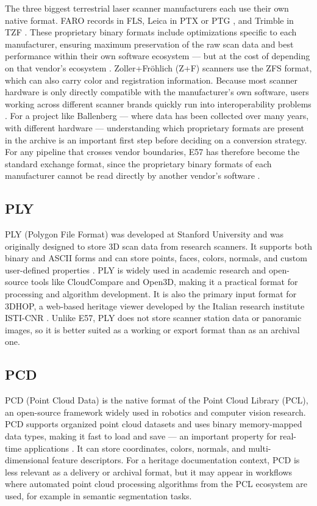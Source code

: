 \documentclass[]{report}
\begin{document}
The three biggest terrestrial laser scanner manufacturers each use their own native format.
FARO records in FLS, Leica in PTX or PTG \cite{leica_supported_formats}, and Trimble in TZF \cite{cadinterop_formats}. These
proprietary binary formats include optimizations specific to each manufacturer, ensuring maximum
preservation of the raw scan data and best performance within their own software ecosystem ---
but at the cost of depending on that vendor's ecosystem \cite{cadinterop_formats}. Zoller+Fröhlich
(Z+F) scanners use the ZFS format, which can also carry color and registration information.
Because most scanner hardware is only directly compatible with the manufacturer's own software,
users working across different scanner brands quickly run into interoperability problems
\cite{vercator2021formats}. For a project like Ballenberg --- where data has been collected over
many years, with different hardware --- understanding which proprietary formats are
present in the archive is an important first step before deciding on a conversion strategy.
For any pipeline that crosses vendor boundaries, E57 has therefore become the standard
exchange format, since the proprietary binary formats of each manufacturer cannot be read
directly by another vendor's software \cite{cadinterop_e57}.

\subsection{PLY}

PLY (Polygon File Format) was developed at Stanford University and was originally designed to
store 3D scan data from research scanners. It supports both binary and ASCII forms and can
store points, faces, colors, normals, and custom user-defined properties \cite{loc_ply}. PLY is
widely used in academic research and open-source tools like CloudCompare and Open3D, making
it a practical format for processing and algorithm development. It is also the primary input
format for 3DHOP, a web-based heritage viewer developed by the Italian research institute
ISTI-CNR \cite{potenziani20153dhop}. Unlike E57, PLY does not store scanner station data or panoramic
images, so it is better suited as a working or export format than as an archival one.

\subsection{PCD}

PCD (Point Cloud Data) is the native format of the Point Cloud Library (PCL), an open-source
framework widely used in robotics and computer vision research. PCD supports organized point
cloud datasets and uses binary memory-mapped data types, making it fast to load and save ---
an important property for real-time applications \cite{pcl_pcd}. It can store coordinates,
colors, normals, and multi-dimensional feature descriptors. For a heritage documentation
context, PCD is less relevant as a delivery or archival format, but it may appear in workflows
where automated point cloud processing algorithms from the PCL ecosystem are used, for
example in semantic segmentation tasks.
\end{document}
